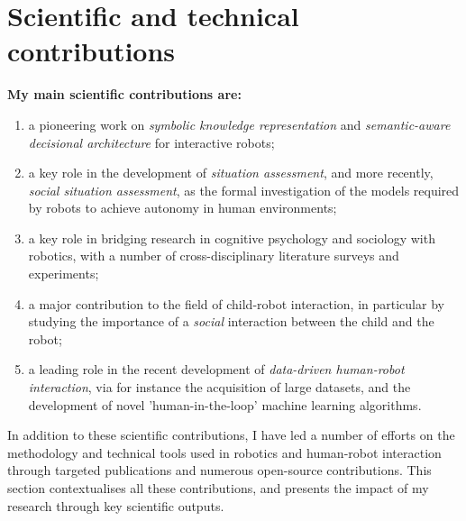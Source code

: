 \section{Scientific and technical contributions}
\label{sci-contribs}


\begin{framed}

    \vspace{1em}
\noindent\bf My main scientific contributions are:

    \vspace{1em}
\begin{enumerate}
    \item a pioneering work on \emph{symbolic knowledge representation} and
        \emph{semantic-aware decisional architecture} for interactive robots;

    \item a key role in the development of \emph{situation assessment}, and more
        recently, \emph{social situation assessment}, as the formal
        investigation of the models required by robots to achieve autonomy in
        human environments;

    \item a key role in bridging research in cognitive psychology and sociology with robotics,
        with a number of cross-disciplinary literature surveys and experiments;

    \item a major contribution to the field of child-robot interaction, in
        particular by studying the importance of a \emph{social} interaction between
        the child and the robot;

    \item a leading role in the recent development of \emph{data-driven
        human-robot interaction}, via for instance the acquisition of large
        datasets, and the development of novel 'human-in-the-loop' machine
        learning algorithms.

\end{enumerate}

\vspace{1em}

\noindent In addition to these scientific contributions, I have led a number of
efforts on the methodology and technical tools used in robotics and human-robot
interaction through targeted publications and numerous open-source contributions.
This section contextualises all these contributions, and presents the impact of my
research through key scientific outputs.

    \vspace{1em}
\end{framed}

